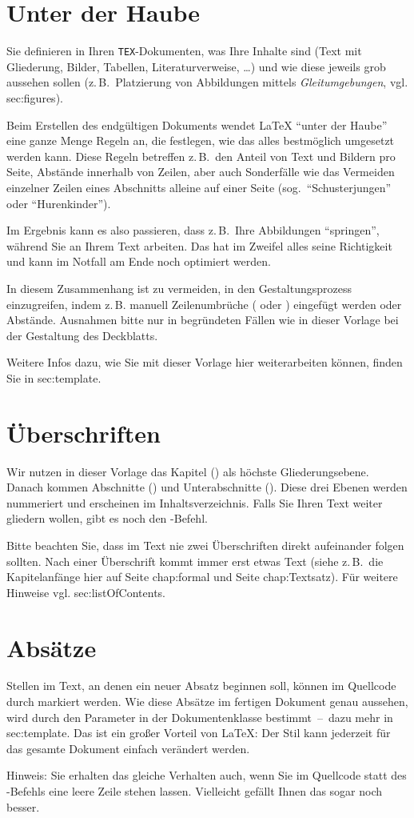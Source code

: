 \section{Unter der Haube}
\label{sec:hood}
Sie definieren in Ihren \texttt{TEX}-Dokumenten, was Ihre Inhalte sind (Text mit Gliederung, Bilder, Tabellen, Literaturverweise, \ldots) und wie diese jeweils grob aussehen sollen (z.\,B.\ Platzierung von Abbildungen mittels \emph{Gleitumgebungen}, vgl. sec:figures).
\par
Beim Erstellen des endgültigen Dokuments wendet \LaTeX{} \enquote{unter der Haube} eine ganze Menge Regeln an, die festlegen, wie das alles bestmöglich umgesetzt werden kann. Diese Regeln betreffen z.\,B.\ den Anteil von Text und Bildern pro Seite, Abstände innerhalb von Zeilen, aber auch Sonderfälle wie das Vermeiden einzelner Zeilen eines Abschnitts alleine auf einer Seite (sog.\ \enquote{Schusterjungen} oder \enquote{Hurenkinder}).
\par
Im Ergebnis kann es also passieren, dass z.\,B.\ Ihre Abbildungen \enquote{springen}, während Sie an Ihrem Text arbeiten. Das hat im Zweifel alles seine Richtigkeit und kann im Notfall am Ende noch optimiert werden.
\par
In diesem Zusammenhang ist zu vermeiden, in den Gestaltungsprozess einzugreifen, indem z.\,B. manuell Zeilenumbrüche ( oder \comm{\textbackslash}) eingefügt werden oder Abstände. Ausnahmen bitte nur in begründeten Fällen wie in dieser Vorlage bei der Gestaltung des Deckblatts.
\par
Weitere Infos dazu, wie Sie mit dieser Vorlage hier weiterarbeiten können, finden Sie in sec:template.
%
%
\section{Überschriften}
\label{sec:headings}
Wir nutzen in dieser Vorlage das Kapitel () als höchste Gliederungsebene. Danach kommen Abschnitte () und Unterabschnitte (). Diese drei Ebenen werden nummeriert und erscheinen im Inhaltsverzeichnis. Falls Sie Ihren Text weiter gliedern wollen, gibt es noch den -Befehl.
\par
Bitte beachten Sie, dass im Text nie zwei Überschriften direkt aufeinander folgen sollten. Nach einer Überschrift kommt immer erst etwas Text (siehe z.\,B.\ die Kapitelanfänge hier auf Seite chap:formal und Seite chap:Textsatz). Für weitere Hinweise vgl. sec:listOfContents.
%
%
\section{Absätze}
Stellen im Text, an denen ein neuer Absatz beginnen soll, können im Quellcode durch  markiert werden. Wie diese Absätze im fertigen Dokument genau aussehen, wird durch den Parameter  in der Dokumentenklasse bestimmt~--~dazu mehr in sec:template. Das ist ein großer Vorteil von \LaTeX{}: Der Stil kann jederzeit für das gesamte Dokument einfach verändert werden.
\par
Hinweis: Sie erhalten das gleiche Verhalten auch, wenn Sie im Quellcode statt des -Befehls eine leere Zeile stehen lassen. Vielleicht gefällt Ihnen das sogar noch besser.
%
%
